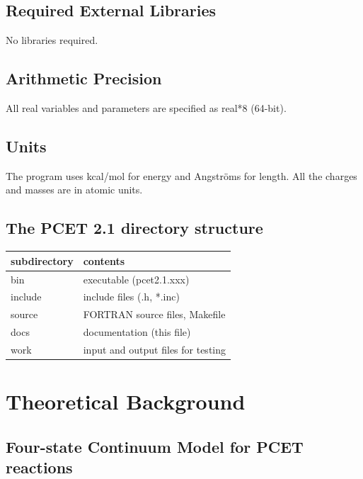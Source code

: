 \documentclass[oneside,11pt,openany]{book}
\newcommand{\tw}{\ttfamily}
\begin{document}
\section{Required External Libraries}
No libraries required.

\section{Arithmetic Precision}
All real variables and parameters are specified as real*8 (64-bit).

\section{Units}
The program uses kcal/mol for energy and Angstr\"oms for length.
All the charges and masses are in atomic units.

\section{The PCET 2.1 directory structure}
\begin{tabular}{ll}
subdirectory & contents \\ \hline
bin     & executable ({\tw pcet2.1.xxx}) \\
include & include files ({\tw *.h, *.inc})\\
source  & FORTRAN source files, {\tw Makefile} \\
docs    & documentation (this file) \\
work    & input and output files for testing \\ \hline
\end{tabular}

\chapter{Theoretical Background}

\section{Four-state Continuum Model for PCET reactions}
\end{document}
